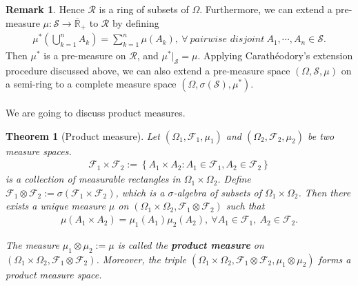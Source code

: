 \documentclass{article}
\numberwithin{equation}{section}
\theoremstyle{plain}
\newtheorem{theorem}{Theorem}[section]
\theoremstyle{definition}
\newtheorem*{remark}{Remark}
\begin{document}
\begin{remark}
Hence $\mathscr{R}$ is a ring of subsets of $\Omega$. Furthermore, we can extend a pre-measure $\mu:\mathscr{S}\to\overline{\mathbb{R}}_+$ to $\mathscr{R}$ by defining
\begin{align*}
	\mu^*\left(\bigcup_{k=1}^n A_k\right) = \sum_{k=1}^n \mu(A_k),\ \forall\ \textit{pairwise disjoint}\ A_1,\cdots,A_n\in\mathscr{S}.
\end{align*}
Then $\mu^*$ is a pre-measure on $\mathscr{R}$, and $\mu^*|_\mathscr{S}=\mu$. Applying Carathéodory's extension procedure discussed above, we can also extend a pre-measure space $(\Omega,\mathscr{S},\mu)$ on a semi-ring to a complete measure space $(\Omega,\sigma(\mathscr{S}),\mu^*)$.
\end{remark}

\paragraph{} We are going to discuss product measures.
\begin{theorem}[Product measure]
\label{thm:1.25} Let $(\Omega_1,\mathscr{F}_1,\mu_1)$ and $(\Omega_2,\mathscr{F}_2,\mu_2)$ be two  measure spaces.
\begin{align*}
	\mathscr{F}_1\times\mathscr{F}_2 := \left\{A_1\times A_2:A_1\in\mathscr{F}_1,A_2\in\mathscr{F}_2\right\}
\end{align*}
is a collection of measurable rectangles in $\Omega_1\times\Omega_2$. Define $\mathscr{F}_1\otimes\mathscr{F}_2:=\sigma(\mathscr{F}_1\times\mathscr{F}_2)$, which is a $\sigma$-algebra of subsets of $\Omega_1\times\Omega_2$. Then there exists a unique measure $\mu$ on $(\Omega_1\times\Omega_2,\mathscr{F}_1\otimes\mathscr{F}_2)$ such that
\begin{align*}
	\mu(A_1\times A_2) = \mu_1(A_1)\mu_2(A_2),\ \forall A_1\in\mathscr{F}_1,\ A_2\in\mathscr{F}_2.
\end{align*}

The measure $\mu_1\otimes\mu_2:=\mu$ is called the \textbf{product measure} on $(\Omega_1\times\Omega_2,\mathscr{F}_1\otimes\mathscr{F}_2)$. Moreover, the triple $(\Omega_1\times\Omega_2,\mathscr{F}_1\otimes\mathscr{F}_2,\mu_1\otimes\mu_2)$ forms a product measure space.
\end{theorem}
\end{document}
